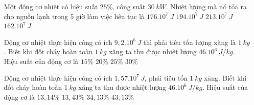 
\begin{ex}
	Một động cơ nhiệt có hiệu suất $25 \%$, công suất $30\ kW$. Nhiệt lượng mà nó tỏa ra cho nguồn lạnh trong 5 giờ làm việc liên tục là
	\choice
	{$176.10^{7}\ J$}
	{$194 . 10^{7}\ J$}
	{$213 . 10^{7}\ J$}
	{\True $162.10^{7}\ J$}
	\end{ex}




\begin{ex} 
	Động cơ nhiệt thực hiện công có ích $9,2.10^6 \ J$ thì phải tiêu tốn lượng xăng là $1 \ kg$. Biết khi đốt cháy hoàn toàn $1 \ kg$ xăng ta thu được nhiệt lượng $46 . 10^{6} \ J / kg$. Hiệu suất của động cơ là
	\choice
	{$15 \%$}
	{\True $20 \%$}
	{$25 \%$}
	{$30 \%$}
	\loigiai{
	}
\end{ex}
 
\begin{ex} 
	Động cơ nhiệt thực hiện công có ích $1,57.10^7 \ J$, phải tiêu tốn $1 \ kg$ xăng. Biết khi đốt cháy hoàn toàn $1 \ kg$ xăng ta thu được nhiệt lượng $46 . 10^{6} \ J / kg$. Hiệu suất của động cơ là
	\choice
	{$13,14 \%$}
	{$13,43 \%$}
	{\True $34,13 \%$}
	{$43,13 \%$}
	\loigiai{
	}
\end{ex}



